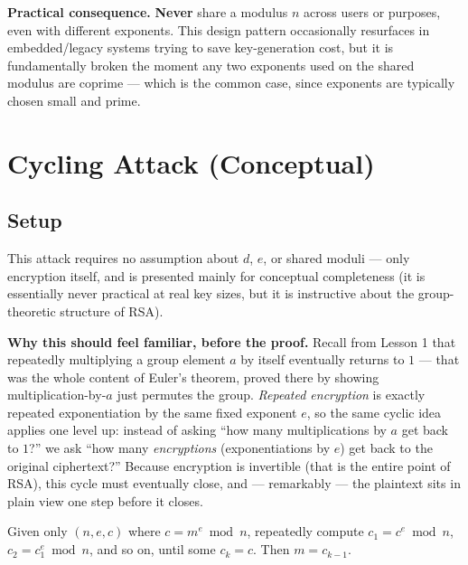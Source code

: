 \medskip\noindent\textbf{Practical consequence.} \textbf{Never} share a modulus $n$ across users or purposes, even with different exponents. This design pattern occasionally resurfaces in embedded/legacy systems trying to save key-generation cost, but it is fundamentally broken the moment any two exponents used on the shared modulus are coprime — which is the common case, since exponents are typically chosen small and prime.

\newpage
\section{Cycling Attack (Conceptual)}

\subsection{Setup}
This attack requires no assumption about $d$, $e$, or shared moduli — only encryption itself, and is presented mainly for conceptual completeness (it is essentially never practical at real key sizes, but it is instructive about the group-theoretic structure of RSA).

\medskip\noindent\textbf{Why this should feel familiar, before the proof.} Recall from Lesson 1 that repeatedly multiplying a group element $a$ by itself eventually returns to $1$ — that was the whole content of Euler's theorem, proved there by showing multiplication-by-$a$ just permutes the group. \emph{Repeated encryption} is exactly repeated exponentiation by the same fixed exponent $e$, so the same cyclic idea applies one level up: instead of asking ``how many multiplications by $a$ get back to $1$?'' we ask ``how many \emph{encryptions} (exponentiations by $e$) get back to the original ciphertext?'' Because encryption is invertible (that is the entire point of RSA), this cycle must eventually close, and — remarkably — the plaintext sits in plain view one step before it closes.

\begin{theorem}
Given only $(n,e,c)$ where $c = m^e \bmod n$, repeatedly compute $c_1 = c^e \bmod n$, $c_2 = c_1^{e} \bmod n$, and so on, until some $c_k = c$. Then $m = c_{k-1}$.
\end{theorem}

